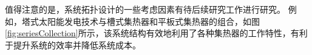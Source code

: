 值得注意的是，系统拓扑设计的一些考虑因素有待后续研究工作进行研究。 例如，塔式太阳能发电技术与槽式集热器和平板式集热器的组合，如图\ref{fig:seriesCollection}所示，该系统结构有效地利用了各种集热器的工作特性，有利于提升系统的效率并降低系统成本。